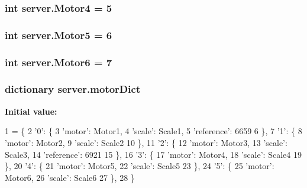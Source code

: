 \subsubsection[{\texorpdfstring{Motor4}{Motor4}}]{\setlength{\rightskip}{0pt plus 5cm}int server.\+Motor4 = 5}\hypertarget{namespaceserver_afdb0b7fd94db47ff97518c814a37d65b}{}\label{namespaceserver_afdb0b7fd94db47ff97518c814a37d65b}
\subsubsection[{\texorpdfstring{Motor5}{Motor5}}]{\setlength{\rightskip}{0pt plus 5cm}int server.\+Motor5 = 6}\hypertarget{namespaceserver_a7ecb18c069c04be820a9f13b78239ad7}{}\label{namespaceserver_a7ecb18c069c04be820a9f13b78239ad7}
\subsubsection[{\texorpdfstring{Motor6}{Motor6}}]{\setlength{\rightskip}{0pt plus 5cm}int server.\+Motor6 = 7}\hypertarget{namespaceserver_a920ae2aa2476b38b98339a8c31a83250}{}\label{namespaceserver_a920ae2aa2476b38b98339a8c31a83250}
\subsubsection[{\texorpdfstring{motor\+Dict}{motorDict}}]{\setlength{\rightskip}{0pt plus 5cm}dictionary server.\+motor\+Dict}\hypertarget{namespaceserver_a8cdf5bf3b7e067152c8db6bf72cfd6c7}{}\label{namespaceserver_a8cdf5bf3b7e067152c8db6bf72cfd6c7}
{\bfseries Initial value\+:}
\begin{DoxyCode}
1 = \{
2         \textcolor{stringliteral}{'0'}: \{
3             \textcolor{stringliteral}{'motor'}: Motor1,
4             \textcolor{stringliteral}{'scale'}: Scale1,
5             \textcolor{stringliteral}{'reference'}: 6659
6             \},
7         \textcolor{stringliteral}{'1'}: \{
8             \textcolor{stringliteral}{'motor'}: Motor2,
9             \textcolor{stringliteral}{'scale'}: Scale2
10             \},
11         \textcolor{stringliteral}{'2'}: \{
12             \textcolor{stringliteral}{'motor'}: Motor3,
13             \textcolor{stringliteral}{'scale'}: Scale3,
14             \textcolor{stringliteral}{'reference'}: 6921
15             \},
16         \textcolor{stringliteral}{'3'}: \{
17             \textcolor{stringliteral}{'motor'}: Motor4,
18             \textcolor{stringliteral}{'scale'}: Scale4
19             \},
20         \textcolor{stringliteral}{'4'}: \{
21             \textcolor{stringliteral}{'motor'}: Motor5,
22             \textcolor{stringliteral}{'scale'}: Scale5
23             \},
24         \textcolor{stringliteral}{'5'}: \{
25             \textcolor{stringliteral}{'motor'}: Motor6,
26             \textcolor{stringliteral}{'scale'}: Scale6
27             \},
28         \}
\end{DoxyCode}

